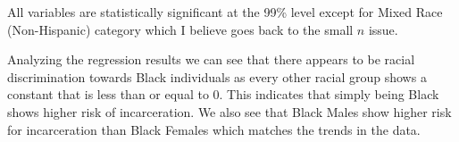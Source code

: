 \documentclass{article}
\begin{document}


All variables are statistically significant at the 99\% level except for Mixed Race (Non-Hispanic) category which I believe goes back to the small $n$ issue.

Analyzing the regression results we can see that there appears to be racial discrimination towards Black individuals as every other racial group shows a constant that is less than or equal to 0. This indicates that simply being Black shows higher risk of incarceration. We also see that Black Males show higher risk for incarceration than Black Females which matches the trends in the data.
\end{document}
